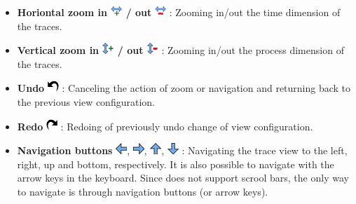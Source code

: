 \begin{itemize}
\item \textbf{Horiontal zoom in \includegraphics{fig/hpctraceviewer-button-zoom-in-time.png} / out }\includegraphics{fig/hpctraceviewer-button-zoom-out-time.png} : Zooming in/out the time dimension of the traces. 
\item \textbf{Vertical zoom in \includegraphics[scale=.5]{fig/hpctraceviewer-button-zoom-in-process.png} / out \includegraphics[scale=.5]{fig/hpctraceviewer-button-zoom-out-process.png} }: Zooming in/out the process dimension of the traces.
\item \textbf{Undo} \includegraphics[scale=.5]{fig/hpctraceviewer-button-undo.png} : Canceling the action of zoom or navigation and returning back to the previous view configuration.
\item \textbf{Redo} \includegraphics[scale=.5]{fig/hpctraceviewer-button-redo.png} : Redoing of previously undo change of view configuration.
\item \textbf{Navigation buttons} \includegraphics[scale=.5]{fig/hpctraceviewer-button-go-east.png}, \includegraphics[scale=.5]{fig/hpctraceviewer-button-go-west.png}, \includegraphics[scale=.5]{fig/hpctraceviewer-button-go-north.png}, \includegraphics[scale=.5]{fig/hpctraceviewer-button-go-south.png} : Navigating the trace view to the left, right, up and bottom, respectively. It is also possible to navigate with the arrow keys in the keyboard. Since \traceview{} does not support scrool bars, the only way to navigate is through navigation buttons (or arrow keys).

\end{itemize}

